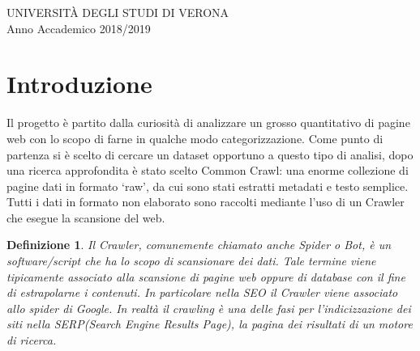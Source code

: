\documentclass{article}
\title{Analisi della lingua di pagine web\\
            tramite un algoritmo \MR \\ \vskip 5px
            \large Progetto Finale Big Data}
\author{Crosara Marco VR434403}
\date{Marzo 2019 / Aprile 2019}
\newcommand{\CC}{Common Crawl}
\newtheorem*{definition}{Definizione}
\begin{document}
\maketitle
\thispagestyle{empty}

\vspace{\fill}

\begin{center}
  UNIVERSITÀ DEGLI STUDI DI VERONA\\
Anno Accademico 2018/2019
\end{center}

\newpage

\tableofcontents
\thispagestyle{empty}

\newpage



\section{Introduzione}

Il progetto è partito dalla curiosità di analizzare un grosso quantitativo di pagine web con lo scopo di farne in qualche modo categorizzazione. Come punto di partenza si è scelto di cercare un dataset opportuno a questo tipo di analisi, dopo una ricerca approfondita è stato scelto \CC{}\cite{commoncrawl}: una enorme collezione di pagine dati in formato `raw', da cui sono stati estratti metadati e testo semplice. Tutti i dati in formato non elaborato sono raccolti mediante l'uso di un Crawler che esegue la scansione del web.

\begin{definition}
Il Crawler, comunemente chiamato anche Spider o Bot, è un software/script che ha lo scopo di scansionare dei dati. Tale termine viene tipicamente associato alla scansione di pagine web oppure di database con il fine di estrapolarne i contenuti. In particolare nella SEO il Crawler viene associato allo spider di Google. In realtà il crawling è una delle fasi per l’indicizzazione dei siti nella SERP(Search Engine Results Page), la pagina dei risultati di un motore di ricerca.
\end{definition}
\end{document}
